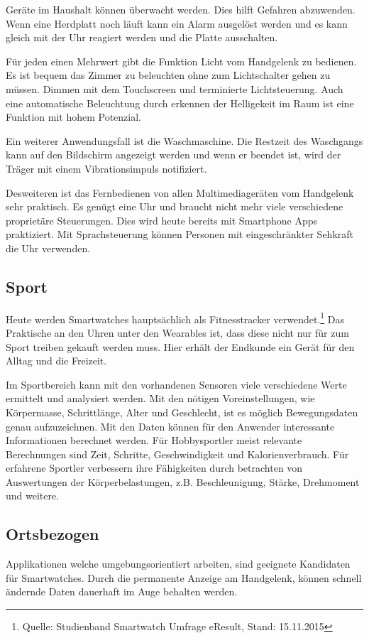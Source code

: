 Geräte im Haushalt können überwacht werden. Dies hilft Gefahren abzuwenden. Wenn eine Herdplatt noch läuft kann ein Alarm ausgelöst werden und es kann gleich mit der Uhr reagiert werden und die Platte ausschalten.

Für jeden einen Mehrwert gibt die Funktion Licht vom Handgelenk zu bedienen. Es ist bequem das Zimmer zu beleuchten ohne zum Lichtschalter gehen zu müssen. Dimmen mit dem Touchscreen und terminierte Lichtsteuerung. Auch eine automatische Beleuchtung durch erkennen der Helligekeit im Raum ist eine Funktion mit hohem Potenzial.

Ein weiterer Anwendungsfall ist die Waschmaschine. Die Restzeit des Waschgangs kann auf den Bildschirm angezeigt werden und wenn er beendet ist, wird der Träger mit einem Vibrationsimpuls notifiziert.

Desweiteren ist das Fernbedienen von allen Multimediageräten vom Handgelenk sehr praktisch. Es genügt eine Uhr und braucht nicht mehr viele verschiedene proprietäre Steuerungen. Dies wird heute bereits mit Smartphone Apps praktiziert. Mit Sprachsteuerung können Personen mit eingeschränkter Sehkraft die Uhr verwenden.

\subsection{Sport}
Heute werden Smartwatches hauptsächlich als Fitnesstracker verwendet.\footnote{Quelle: Studienband Smartwatch Umfrage eResult, Stand: 15.11.2015} Das Praktische an den Uhren unter den Wearables ist, dass diese nicht nur für zum Sport treiben gekauft werden muss. Hier erhält der Endkunde ein Gerät für den Alltag und die Freizeit.

Im Sportbereich kann mit den vorhandenen Sensoren viele verschiedene Werte ermittelt und analysiert werden. Mit den nötigen Voreinstellungen, wie Körpermasse, Schrittlänge, Alter und Geschlecht, ist es möglich Bewegungsdaten genau aufzuzeichnen. Mit den Daten können für den Anwender interessante Informationen berechnet werden. Für Hobbysportler meist relevante Berechnungen sind Zeit, Schritte, Geschwindigkeit und Kalorienverbrauch. Für erfahrene Sportler verbessern ihre Fähigkeiten durch betrachten von Auswertungen der Körperbelastungen, z.B. Beschleunigung, Stärke, Drehmoment und weitere.

\subsection{Ortsbezogen}
Applikationen welche umgebungsorientiert arbeiten, sind geeignete Kandidaten für Smartwatches. Durch die permanente Anzeige am Handgelenk, können schnell ändernde Daten dauerhaft im Auge behalten werden.

